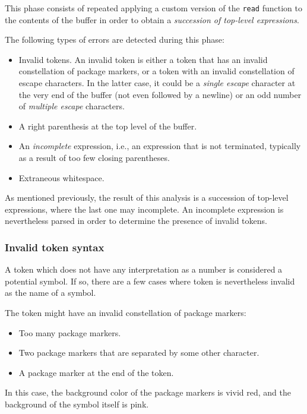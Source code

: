 This phase consists of repeated applying a custom version of the
\commonlisp{} \texttt{read} function to the contents of the buffer in
order to obtain a \emph{succession of top-level expressions}.

The following types of errors are detected during this phase:

\begin{itemize}
\item Invalid tokens.  An invalid token is either a token that has an
  invalid constellation of package markers, or a token with an invalid
  constellation of escape characters.  In the latter case, it could be
  a \emph{single escape} character at the very end of the buffer (not
  even followed by a newline) or an odd number of \emph{multiple
    escape} characters.
\item A right parenthesis at the top level of the buffer.
\item An \emph{incomplete} expression, i.e., an expression that is not
  terminated, typically as a result of too few closing parentheses.
\item Extraneous whitespace. 
\end{itemize}

As mentioned previously, the result of this analysis is a succession
of top-level expressions, where the last one may incomplete.  An
incomplete expression is nevertheless parsed in order to determine the
presence of invalid tokens.  

\subsubsection{Invalid token syntax}

A token which does not have any interpretation as a number is
considered a potential symbol.  If so, there are a few cases where
token is nevertheless invalid as the name of a symbol.

The token might have an invalid constellation of package markers:

\begin{itemize}
\item Too many package markers.
\item Two package markers that are separated by some other character. 
\item A package marker at the end of the token.
\end{itemize}

In this case, the background color of the package markers is vivid
red, and the background of the symbol itself is pink. 

